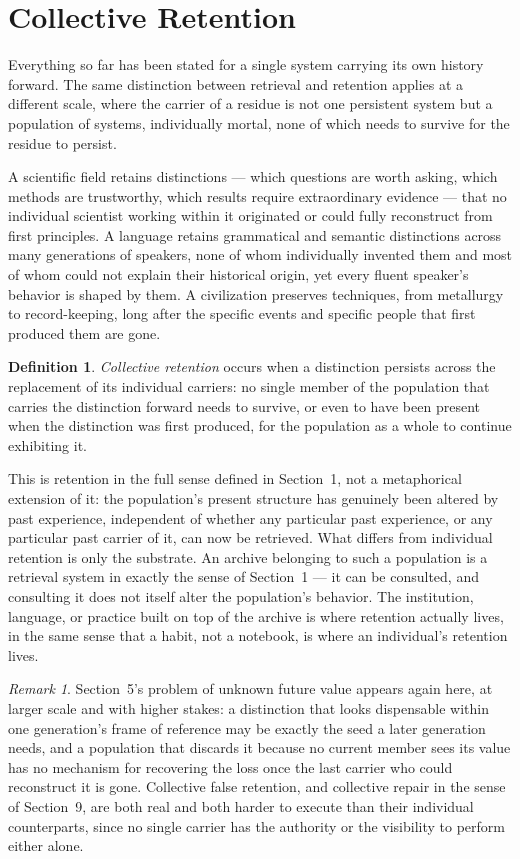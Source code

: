 \documentclass[11pt]{amsart}
\theoremstyle{plain}
\theoremstyle{definition}
\newtheorem{definition}[theorem]{Definition}
\theoremstyle{remark}
\newtheorem{remark}[theorem]{Remark}
\begin{document}
\section{Collective Retention}

Everything so far has been stated for a single system carrying its own
history forward. The same distinction between retrieval and retention
applies at a different scale, where the carrier of a residue is not one
persistent system but a population of systems, individually mortal, none
of which needs to survive for the residue to persist.

A scientific field retains distinctions --- which questions are worth
asking, which methods are trustworthy, which results require
extraordinary evidence --- that no individual scientist working within
it originated or could fully reconstruct from first principles. A
language retains grammatical and semantic distinctions across many
generations of speakers, none of whom individually invented them and
most of whom could not explain their historical origin, yet every
fluent speaker's behavior is shaped by them. A civilization preserves
techniques, from metallurgy to record-keeping, long after the specific
events and specific people that first produced them are gone.

\begin{definition}
\emph{Collective retention} occurs when a distinction persists across
the replacement of its individual carriers: no single member of the
population that carries the distinction forward needs to survive, or
even to have been present when the distinction was first produced, for
the population as a whole to continue exhibiting it.
\end{definition}

This is retention in the full sense defined in Section~1, not a
metaphorical extension of it: the population's present structure has
genuinely been altered by past experience, independent of whether any
particular past experience, or any particular past carrier of it, can
now be retrieved. What differs from individual retention is only the
substrate. An archive belonging to such a population is a retrieval
system in exactly the sense of Section~1 --- it can be consulted, and
consulting it does not itself alter the population's behavior. The
institution, language, or practice built on top of the archive is
where retention actually lives, in the same sense that a habit, not a
notebook, is where an individual's retention lives.

\begin{remark}
Section~5's problem of unknown future value appears again here, at
larger scale and with higher stakes: a distinction that looks
dispensable within one generation's frame of reference may be exactly
the seed a later generation needs, and a population that discards it
because no current member sees its value has no mechanism for
recovering the loss once the last carrier who could reconstruct it is
gone. Collective false retention, and collective repair in the sense of
Section~9, are both real and both harder to execute than their
individual counterparts, since no single carrier has the authority or
the visibility to perform either alone.
\end{remark}
\end{document}
